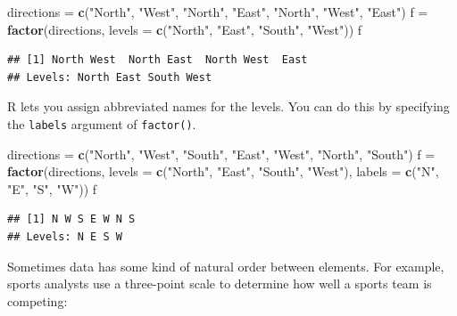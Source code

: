 \documentclass[
]{book}
\newenvironment{Shaded}{\begin{snugshade}}{\end{snugshade}}
\newcommand{\DataTypeTok}[1]{\textcolor[rgb]{0.13,0.29,0.53}{#1}}
\newcommand{\KeywordTok}[1]{\textcolor[rgb]{0.13,0.29,0.53}{\textbf{#1}}}
\newcommand{\NormalTok}[1]{#1}
\newcommand{\StringTok}[1]{\textcolor[rgb]{0.31,0.60,0.02}{#1}}
\begin{document}
\begin{Shaded}
\begin{Highlighting}[]
\NormalTok{directions =}\StringTok{ }\KeywordTok{c}\NormalTok{(}\StringTok{"North"}\NormalTok{, }\StringTok{"West"}\NormalTok{, }\StringTok{"North"}\NormalTok{, }\StringTok{"East"}\NormalTok{, }\StringTok{"North"}\NormalTok{, }\StringTok{"West"}\NormalTok{, }\StringTok{"East"}\NormalTok{)}
\NormalTok{f =}\StringTok{ }\KeywordTok{factor}\NormalTok{(directions,}
            \DataTypeTok{levels =} \KeywordTok{c}\NormalTok{(}\StringTok{"North"}\NormalTok{, }\StringTok{"East"}\NormalTok{, }\StringTok{"South"}\NormalTok{, }\StringTok{"West"}\NormalTok{))}
\NormalTok{f}
\end{Highlighting}
\end{Shaded}

\begin{verbatim}
## [1] North West  North East  North West  East 
## Levels: North East South West
\end{verbatim}

R lets you assign abbreviated names for the levels. You can do this by specifying the \texttt{labels} argument of \texttt{factor()}.

\begin{Shaded}
\begin{Highlighting}[]
\NormalTok{directions =}\StringTok{ }\KeywordTok{c}\NormalTok{(}\StringTok{"North"}\NormalTok{, }\StringTok{"West"}\NormalTok{, }\StringTok{"South"}\NormalTok{, }\StringTok{"East"}\NormalTok{, }\StringTok{"West"}\NormalTok{, }\StringTok{"North"}\NormalTok{, }\StringTok{"South"}\NormalTok{)}
\NormalTok{f =}\StringTok{ }\KeywordTok{factor}\NormalTok{(directions,}
            \DataTypeTok{levels =} \KeywordTok{c}\NormalTok{(}\StringTok{"North"}\NormalTok{, }\StringTok{"East"}\NormalTok{, }\StringTok{"South"}\NormalTok{, }\StringTok{"West"}\NormalTok{),}
            \DataTypeTok{labels =} \KeywordTok{c}\NormalTok{(}\StringTok{"N"}\NormalTok{, }\StringTok{"E"}\NormalTok{, }\StringTok{"S"}\NormalTok{, }\StringTok{"W"}\NormalTok{))}
\NormalTok{f}
\end{Highlighting}
\end{Shaded}

\begin{verbatim}
## [1] N W S E W N S
## Levels: N E S W
\end{verbatim}

Sometimes data has some kind of natural order between elements. For example, sports analysts use a three-point scale to determine how well a sports team is competing:
\end{document}
